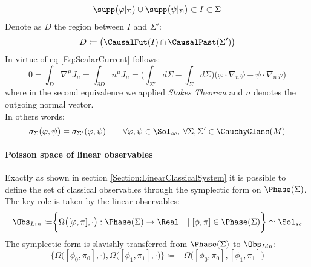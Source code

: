\documentclass[Main]{subfiles}
\begin{document}
\begin{example}
			\begin{displaymath}
				\supp\big(\varphi \vert_\Sigma \big) \cup \supp\big( \psi \vert_\Sigma \big) \subset I \subset \Sigma
			\end{displaymath}
			Denote as $D$ the region between $I$ and $\Sigma'$:
			\begin{displaymath}
				D \coloneqq \big( \CausalFut(I) \cap \CausalPast(\Sigma') \big)
			\end{displaymath}
			In virtue of eq \ref{Eq:ScalarCurrent} follows:
			\begin{displaymath}
				0 = \int_{D} \nabla^\mu J_\mu = \int_{\partial D} n^\mu J_\mu = \big( \int_{\Sigma'} d\Sigma- \int_{\Sigma}d\Sigma \big) \big( \varphi \cdot \nabla_n \psi  - \psi \cdot \nabla_n \varphi \big)
			\end{displaymath}
			where in the second equivalence we applied \emph{Stokes Theorem} and $n$ denotes the outgoing normal vector.
			\\
			In others words:
			\begin{displaymath}
				\sigma_\Sigma ( \varphi, \psi) = \sigma_{\Sigma'} (\varphi, \psi)
				\qquad \forall \varphi, \psi \in \Sol_{sc},\: \forall \Sigma, \Sigma' \in \CauchyClass(M)
			\end{displaymath}


		\end{example}

		\paragraph{Poisson space of linear observables}
		Exactly as shown in section \ref{Section:LinearClassicalSystem} it is possible to define the set of classical observables through the symplectic form on $\Phase(\Sigma)$.
		The key role is taken by the linear observables:
		\begin{displaymath}
			\Obs_{Lin} \coloneqq \biggr\{ \Omega\big( [\varphi, \pi], \cdot \big): \Phase(\Sigma) \rightarrow \Real \quad \vert\; [\phi,\pi]\in \Phase(\Sigma) \biggr\}	\simeq \Sol_{sc}
		\end{displaymath}
		The symplectic form is slavishly transferred from $\Phase(\Sigma)$ to $\Obs_{Lin}$:
		\begin{displaymath}
			\biggr\{ \Omega\big( [\phi_0,\pi_0], \cdot \big) , \Omega \big( [\phi_1,\pi_1], \cdot \big) \biggr\} \coloneqq
			- \Omega\big( [\phi_0, \pi_0], [\phi_1, \pi_1]\big)
		\end{displaymath}
\end{document}
